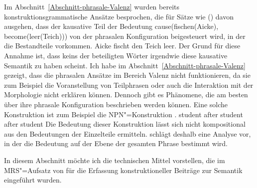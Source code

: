 Im Abschnitt~\ref{Abschnitt-phrasale-Valenz} wurden bereits konstruktionsgrammatische Ansätze
besprochen, die für Sätze wie () davon ausgehen, dass der kausative Teil der Bedeutung
cause(fischen(Aicke), become(leer(Teich))) von der phrasalen Konfiguration beigesteuert wird, in der
die Bestandteile vorkommen.
\ea
Aicke fischt den Teich leer.
\z
Der Grund für diese Annahme ist, dass keins der beteiligten Wörter irgendwie diese kausative
Semantik zu haben scheint. Ich habe im Abschnitt~\ref{Abschnitt-phrasale-Valenz} gezeigt, dass die
phrasalen Ansätze im Bereich Valenz nicht funktionieren, da sie zum Beispiel die Voranstellung von
Teilphrasen oder auch die Interaktion mit der Morphologie nicht erklären können. Dennoch gibt es
Phänomene, die am besten über ihre phrasale Konfiguration beschrieben werden können. Eine solche
Konstruktion ist zum Beispiel die NPN"=Konstruktion \parencites{Matsuyama2004a,Jackendoff2008a,Bargmann2015a}[Kapitel~6.2]{Bargmann2023a-u}.
\ea
student after student after student
\z
Die Bedeutung dieser Konstruktion lässt sich nicht kompositional aus den Bedeutungen der Einzelteile
ermitteln. \citet{Bargmann2015a} schlägt deshalb eine Analyse vor, in der die Bedeutung auf der
Ebene der gesamten Phrase bestimmt wird.

In diesem Abschnitt möchte ich die technischen Mittel vorstellen, die im MRS"=Aufsatz von \citet{CFPS2005a} für
die Erfassung konstruktioneller Beiträge zur Semantik eingeführt wurden.

